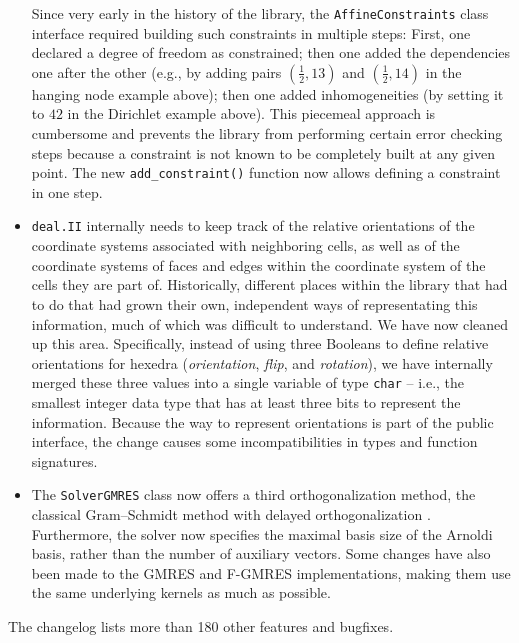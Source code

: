 \documentclass{ansarticle-preprint}
\newcommand{\specialword}[1]{\texttt{#1}}
\newcommand{\dealii}{{\specialword{deal.II}}\xspace}
\begin{document}
\begin{itemize}
    Since very early in the history of the library, the
    \texttt{AffineConstraints} class interface required building such
    constraints in multiple steps: First, one declared a degree of
    freedom as constrained; then one added the dependencies one after
    the other (e.g., by adding pairs $(\frac 12, 13)$ and $(\frac 12,
    14)$ in the hanging node example above); then one added
    inhomogeneities (by setting it to $42$ in the Dirichlet example
    above). This piecemeal approach is cumbersome and prevents the
    library from performing certain error checking steps because a
    constraint is not known to be completely built at any given point. The new
    \texttt{add\_constraint()} function now allows defining a
    constraint in one step.
  \item \dealii{} internally needs to keep track of the relative
    orientations of the coordinate systems associated with neighboring
    cells, as well as of the coordinate systems of faces and edges
    within the coordinate system of the cells they are part
    of. Historically, different places within the library that had to
    do that had grown their own, independent ways of representating
    this information, much of which was difficult to understand.
    We have now cleaned up this area. Specifically, instead of using three
    Booleans to define relative orientations for hexedra (\textit{orientation},
    \textit{flip}, and \textit{rotation}), we have internally merged these three values into a single variable of type
     \texttt{char} -- i.e., the smallest integer data type that has at
     least three bits to represent the information. Because the way to represent
     orientations is part of the public interface, the change causes
     some incompatibilities in types and function signatures.
\item The \texttt{SolverGMRES} class now offers a third orthogonalization
  method, the classical Gram--Schmidt method with delayed orthogonalization
  \cite{Bielich2022}. Furthermore, the solver now specifies the maximal basis
  size of the Arnoldi basis, rather than the number of auxiliary
  vectors. Some changes have also been made to the GMRES and F-GMRES
  implementations, making them use the same underlying kernels as much as possible.
\end{itemize}
%
The changelog lists more than 180 other features and bugfixes.


\end{document}
